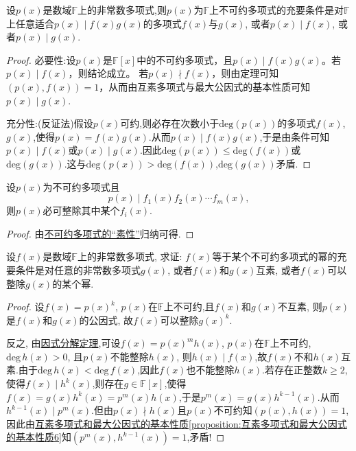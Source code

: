 \documentclass[../../main.tex]{subfiles}%
\begin{document}
\begin{theorem}[不可约多项式的“素性”]\label{theorem:不可约多项式的“素性”}
设\(p(x)\)是数域\(\mathbb{F}\)上的非常数多项式,则\(p(x)\)为\(\mathbb{F}\)上不可约多项式的充要条件是对\(\mathbb{F}\)上任意适合\(p(x)\mid f(x)g(x)\)的多项式\(f(x)\)与\(g(x)\), 或者\(p(x)\mid f(x)\), 或者\(p(x)\mid g(x)\).
\end{theorem}
\begin{proof}

必要性:设\(p(x)\)是\(\mathbb{F}[x]\)中的不可约多项式，且\(p(x)\mid f(x)g(x)\)。若\(p(x)\mid f(x)\)，则结论成立。
若\(p(x)\nmid f(x)\)，则由定理可知\((p(x),f(x)) = 1\)，从而由互素多项式与最大公因式的基本性质可知\(p(x)\mid g(x)\).

充分性:(反证法)假设\(p(x)\)可约,则必存在次数小于\(\text{deg}(p(x))\)的多项式\(f(x)\),\(g(x)\),使得\(p(x) = f(x)g(x)\).从而\(p(x) \mid f(x)g(x)\),于是由条件可知\(p(x) \mid f(x)\)或\(p(x) \mid g(x)\).因此\(\text{deg}(p(x)) \leqslant  \text{deg}(f(x))\)或\(\text{deg}(g(x))\).这与\(\text{deg}(p(x)) > \text{deg}(f(x))\),\(\text{deg}(g(x))\)矛盾.

\end{proof}

\begin{corollary}\label{corollary:不可约多项式“素性”的推论}
设\(p(x)\)为不可约多项式且
\[
p(x)\mid f_1(x)f_2(x)\cdots f_m(x),
\]
则\(p(x)\)必可整除其中某个\(f_i(x)\).
\end{corollary}
\begin{proof}

由\hyperref[theorem:不可约多项式的“素性”]{不可约多项式的“素性”}归纳可得.

\end{proof}

\begin{proposition}\label{proposition:多项式可以写成不可约多项式的幂的充要条件}
设\(f(x)\)是数域\(\mathbb{F}\)上的非常数多项式, 求证: \(f(x)\)等于某个不可约多项式的幂的充要条件是对任意的非常数多项式\(g(x)\), 或者\(f(x)\)和\(g(x)\)互素, 或者\(f(x)\)可以整除\(g(x)\)的某个幂.
\end{proposition}
\begin{proof}

设\(f(x)=p(x)^k\), \(p(x)\)在\(\mathbb{F}\)上不可约,且\(f(x)\)和\(g(x)\)不互素, 则\(p(x)\)是\(f(x)\)和\(g(x)\)的公因式, 故\(f(x)\)可以整除\(g(x)^k\).

反之, 由\hyperref[theorem:因式分解定理]{因式分解定理},可设\(f(x)=p(x)^mh(x)\), \(p(x)\)在\(\mathbb{F}\)上不可约, \(\mathrm{deg }\,h(x)>0\), 且\(p(x)\)不能整除\(h(x)\), 则\(h(x)\mid f(x)\),故$f(x)$不和$h(x)$互素.由于$\mathrm{deg}\,h(x)<\mathrm{deg }\,f(x)$,因此$f(x)$也不能整除\(h(x)\).若存在正整数$k\geqslant 2$,使得$f(x)\mid h^k(x)$,则存在$g\in \mathbb{F}[x]$,使得$f(x)=g(x)h^k(x)=p^m(x)h(x)$,于是$p^m(x)=g(x)h^{k-1}(x)$.从而$h^{k-1}(x)\mid p^m(x)$.但由$p(x)\nmid h(x)$且$p(x)$不可约知$(p(x),h(x))=1$,因此由\hyperref[proposition:互素多项式和最大公因式的基本性质6]{互素多项式和最大公因式的基本性质\ref{proposition:互素多项式和最大公因式的基本性质6}}知$(p^m(x),h^{k-1}(x))=1$,矛盾!

\end{proof}
\end{document}
